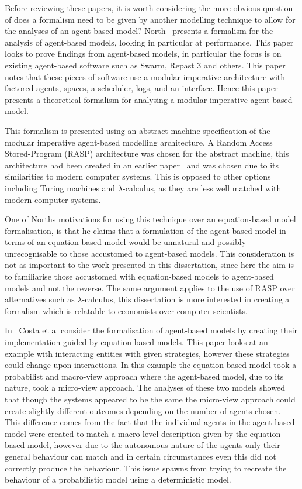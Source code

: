 \documentclass{article}
\begin{document}
Before reviewing these papers, it is worth considering the more obvious question of does a formalism need to be given by another modelling technique to allow for the analyses of an agent-based model? North~\cite{taabm} present\textsc{}s a formalism for the analysis of agent-based models, looking in particular at performance. This paper looks to prove findings from agent-based models, in particular the focus is on existing agent-based software such as Swarm, Repast 3 and others. This paper notes that these pieces of software use a modular imperative architecture with factored agents, spaces, a scheduler, logs, and an interface. Hence this paper presents a theoretical formalism for analysing a modular imperative agent-based model.    

This formalism is presented using an abstract machine specification of the modular imperative agent-based modelling architecture. A  Random Access Stored-Program (RASP) architecture was chosen for the abstract machine, this architecture had been created in an earlier paper~\cite{raspceated} and was chosen due to its similarities to modern computer systems. This is opposed to other options including Turing machines and $\lambda$-calculus, as they are less well matched with modern computer systems.     

One of North\textsc{}s motivations for using this technique over an equation-based model formalisation, is that he claims that a formulation of the agent-based model in terms of an equation-based model would be unnatural and possibly unrecognisable to those accustomed to agent-based models. This consideration is not as important to the work presented in this dissertation, since here the aim is to familiarise those accustomed with equation-based models to agent-based models and not the reverse. The same argument applies to the use of RASP over alternatives such as $\lambda$-calculus, this dissertation is more interested in creating a formalism which is relatable to economists over computer scientists.   

In~\cite{ebmabmi} Costa et al consider the formalisation of agent-based models by creating their implementation guided by equation-based models. This paper looks at an example with interacting entities with given strategies, however these strategies could change upon interactions. In this example the equation-based model took a probabilist and macro-view approach where the agent-based model, due to its nature, took a micro-view approach. The analyses of these two models showed that though the systems appeared to be the same the micro-view approach could create slightly different outcomes depending on the number of agents chosen. This difference comes from the fact that the individual agents in the agent-based model were created to match a macro-level description given by the equation-based model, however due to the autonomous nature of the agents only their general behaviour can match and in certain circumstances even this did not correctly produce the behaviour. This issue spawns from trying  to recreate the behaviour of a probabilistic model using a deterministic model. 
\end{document}
